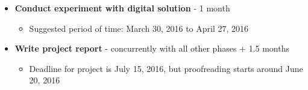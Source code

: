 \documentclass[12pt]{article}
\begin{document}
\begin{itemize}
\begin{itemize}
			\end{itemize}	
		\item \textbf{Conduct experiment with digital solution} - 1 month
			\begin{itemize}
				\item Suggested period of time: March 30, 2016 to April 27, 2016
			\end{itemize}	
		\item \textbf{Write project report} - concurrently with all other phases + 1.5 months
			\begin{itemize}
				\item Deadline for project is July 15, 2016, but proofreading starts around June 20, 2016 
			\end{itemize}	
	\end{itemize}

%




\end{document}
